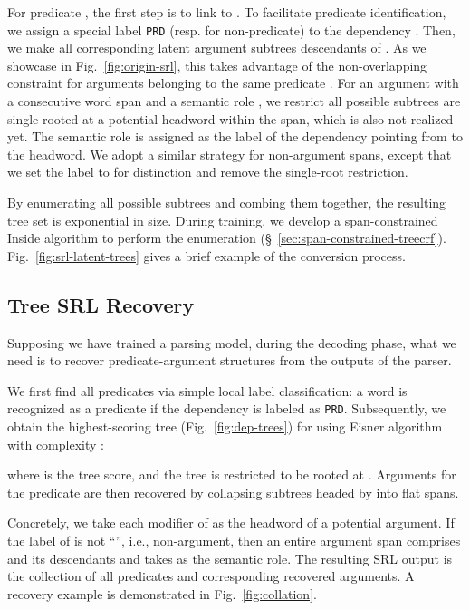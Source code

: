 \documentclass[11pt]{article}
\begin{document}
For predicate , the first step is to link  to .
To facilitate predicate identification, we assign a special label \texttt{PRD} (resp.  for non-predicate) to the dependency .
Then, we make all corresponding latent argument subtrees descendants of .
As we showcase in Fig.~\ref{fig:origin-srl}, this takes advantage of the non-overlapping constraint for arguments belonging to the same predicate \cite{punyakanok-etal-2004-semantic,li-etal-2019-dependency}.
For an argument with a consecutive word span  and a semantic role , we restrict all possible subtrees are single-rooted at a potential headword  within the span, which is also not realized yet.
The semantic role  is assigned as the label of the dependency pointing from  to the headword.
We adopt a similar strategy for non-argument spans, except that we set the label to   for distinction and remove the single-root restriction.

By enumerating all possible subtrees and combing them together, the resulting tree set  is exponential in size.
During training, we develop a span-constrained Inside algorithm to perform the enumeration (\S~\ref{sec:span-constrained-treecrf}).
Fig.~\ref{fig:srl-latent-trees} gives a brief example of the conversion process.








\subsection{Tree  SRL Recovery}\label{sec:srl-recovery}
Supposing we have trained a parsing model, during the decoding phase, what we need is to recover predicate-argument structures from the outputs of the parser.

We first find all predicates via simple local label classification: a word  is recognized as a predicate if the dependency  is labeled as \texttt{PRD}.
Subsequently, we obtain the highest-scoring tree  (Fig.~\ref{fig:dep-trees}) for  using Eisner algorithm \cite{eisner-2000-bilexical} with complexity :

where  is the tree score, and the tree is restricted to be rooted at .
Arguments for the predicate are then recovered by collapsing subtrees headed by  into flat spans.

Concretely, we take each modifier  of  as the headword of a potential argument.
If the label  of  is not ``'', i.e., non-argument, then an entire argument span comprises  and its descendants and takes  as the semantic role.
The resulting SRL output is the collection of all predicates and corresponding recovered arguments.
A recovery example is demonstrated in Fig.~\ref{fig:collation}.
\end{document}
